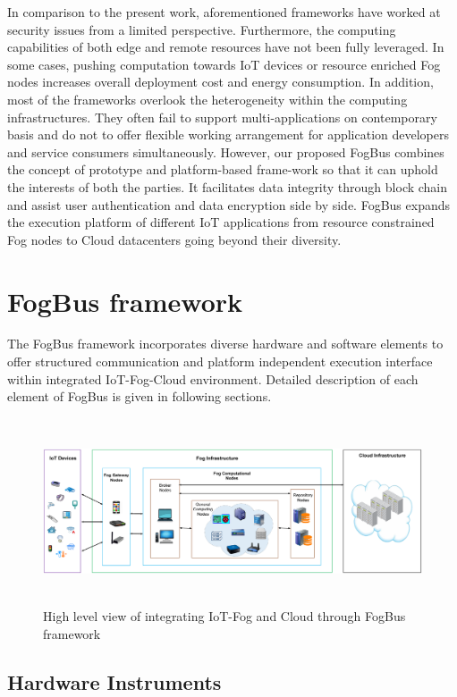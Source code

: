 \documentclass[final,5p,times,twocolumn]{elsarticle}
\begin{document}
%      
\par In comparison to the present work, aforementioned frameworks have worked at security issues from a limited perspective. Furthermore, the computing capabilities of both edge and remote resources have not been fully leveraged. In some cases, pushing computation towards IoT devices or resource enriched Fog nodes increases overall deployment cost and energy consumption. In addition, most of the frameworks overlook the heterogeneity within the computing infrastructures. They often fail to support multi-applications on contemporary basis and do not to offer flexible working arrangement for application developers and service consumers simultaneously. However, our proposed FogBus combines the concept of prototype and platform-based frame-work so that it can uphold the interests of both the parties. It facilitates data integrity through block chain and assist user authentication and data encryption side by side. FogBus expands the execution platform of different IoT applications from resource constrained Fog nodes to Cloud datacenters going beyond their diversity.  
%    
\section{FogBus framework} \label{mainPart}
The FogBus framework incorporates diverse hardware and software elements to offer structured communication and platform independent execution interface within integrated IoT-Fog-Cloud environment. Detailed description of each element of FogBus is given in following sections.    
%
\begin{figure}[t]
\centering 
\includegraphics[width=175mm, height= 55mm]{FogBus.png}
\caption{High level view of integrating IoT-Fog and Cloud through FogBus framework}
\label{Fig:fogbus}
\end{figure}      

\subsection{Hardware Instruments}
\end{document}
